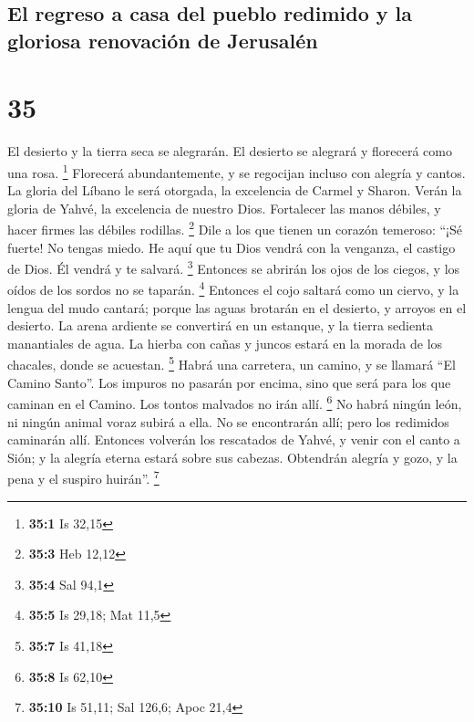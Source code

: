\hypertarget{el-regreso-a-casa-del-pueblo-redimido-y-la-gloriosa-renovaciuxf3n-de-jerusaluxe9n}{%
\subsection{El regreso a casa del pueblo redimido y la gloriosa
renovación de
Jerusalén}\label{el-regreso-a-casa-del-pueblo-redimido-y-la-gloriosa-renovaciuxf3n-de-jerusaluxe9n}}

\hypertarget{section-34}{%
\section{35}\label{section-34}}

 El desierto y la tierra seca se alegrarán. El desierto se
alegrará y florecerá como una rosa. \footnote{\textbf{35:1} Is 32,15}
 Florecerá abundantemente, y se regocijan incluso con
alegría y cantos. La gloria del Líbano le será otorgada, la excelencia
de Carmel y Sharon. Verán la gloria de Yahvé, la excelencia de nuestro
Dios.  Fortalecer las manos débiles, y hacer firmes las
débiles rodillas. \footnote{\textbf{35:3} Heb 12,12}  Dile
a los que tienen un corazón temeroso: ``¡Sé fuerte! No tengas miedo. He
aquí que tu Dios vendrá con la venganza, el castigo de Dios. Él vendrá y
te salvará. \footnote{\textbf{35:4} Sal 94,1}  Entonces se
abrirán los ojos de los ciegos, y los oídos de los sordos no se taparán.
\footnote{\textbf{35:5} Is 29,18; Mat 11,5}  Entonces el
cojo saltará como un ciervo, y la lengua del mudo cantará; porque las
aguas brotarán en el desierto, y arroyos en el desierto. 
La arena ardiente se convertirá en un estanque, y la tierra sedienta
manantiales de agua. La hierba con cañas y juncos estará en la morada de
los chacales, donde se acuestan. \footnote{\textbf{35:7} Is 41,18}
 Habrá una carretera, un camino, y se llamará ``El Camino
Santo''. Los impuros no pasarán por encima, sino que será para los que
caminan en el Camino. Los tontos malvados no irán allí. \footnote{\textbf{35:8}
  Is 62,10}  No habrá ningún león, ni ningún animal voraz
subirá a ella. No se encontrarán allí; pero los redimidos caminarán
allí.  Entonces volverán los rescatados de Yahvé, y venir
con el canto a Sión; y la alegría eterna estará sobre sus cabezas.
Obtendrán alegría y gozo, y la pena y el suspiro huirán''. \footnote{\textbf{35:10}
  Is 51,11; Sal 126,6; Apoc 21,4}

